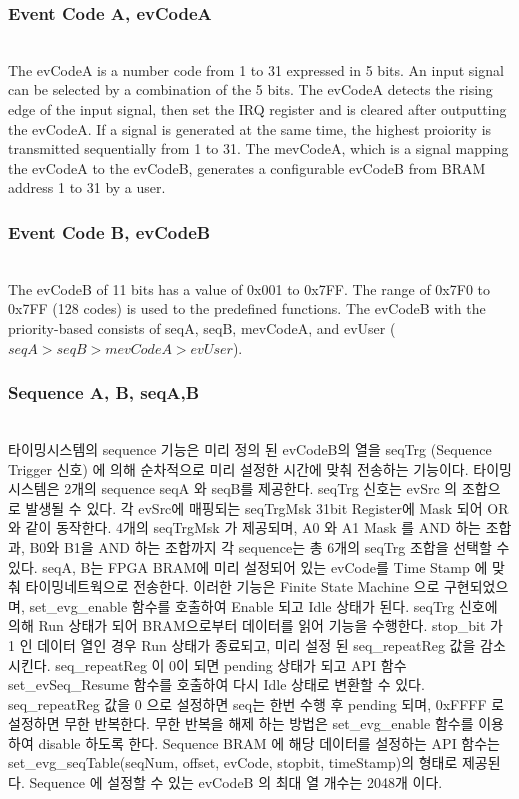 \documentclass[journal]{IEEEtran}
\begin{document}
\subsubsection{Event Code A, evCodeA}\hspace*{\fill} \\
The evCodeA is a number code from 1 to 31 expressed in 5 bits. An input signal can be selected by a combination of the 5 bits. The evCodeA detects the rising edge of the input signal, then set the IRQ register and is cleared after outputting the evCodeA. If a signal is generated at the same time, the highest proiority is transmitted sequentially from 1 to 31. The mevCodeA, which is a signal mapping the evCodeA to the evCodeB, generates a configurable evCodeB from BRAM address 1 to 31 by a user.\newline

\subsubsection{Event Code B, evCodeB}\hspace*{\fill} \\
The evCodeB of 11 bits has a value of 0x001 to 0x7FF. The range of 0x7F0 to 0x7FF (128 codes) is used to the predefined functions. The evCodeB with the priority-based consists of seqA, seqB, mevCodeA, and evUser ($seqA > seqB > mevCodeA > evUser$). \newline

\subsubsection{Sequence A, B, seqA,B}\hspace*{\fill} \\
타이밍시스템의 sequence 기능은 미리 정의 된 evCodeB의 열을 seqTrg (Sequence Trigger 신호) 에 의해 순차적으로 미리 설정한 시간에 맞춰 전송하는 기능이다. 타이밍시스템은 2개의 sequence seqA 와 seqB를 제공한다. seqTrg 신호는 evSrc 의 조합으로 발생될 수 있다. 각 evSrc에 매핑되는 seqTrgMsk 31bit Register에 Mask 되어 OR와 같이 동작한다. 4개의 seqTrgMsk 가 제공되며, A0 와 A1 Mask 를 AND 하는 조합과, B0와 B1을 AND 하는 조합까지 각 sequence는 총 6개의 seqTrg 조합을 선택할 수 있다. seqA, B는 FPGA BRAM에 미리 설정되어 
있는 evCode를 Time Stamp 에 맞춰 타이밍네트웍으로 전송한다. 이러한 기능은 Finite State Machine 으로 구현되었으며, set\_evg\_enable 함수를 호출하여 Enable 되고 Idle 상태가 된다. seqTrg 신호에 의해 Run 상태가 되어 BRAM으로부터 데이터를 읽어 기능을 수행한다. stop\_bit 가 1 인 데이터 열인 경우 Run 상태가 종료되고, 미리 설정 된 seq\_repeatReg 값을
감소시킨다. seq\_repeatReg 이 0이 되면 pending 상태가 되고 API 함수 set\_evSeq\_Resume 함수를 호출하여 다시 Idle 상태로 변환할 수 있다. seq\_repeatReg 값을 0 으로 설정하면 seq는 한번 수행 후 pending 되며, 0xFFFF 로 설정하면 무한 반복한다. 무한 반복을 해제 하는 방법은 set\_evg\_enable 함수를 이용하여 disable 하도록 한다.
Sequence BRAM 에 해당 데이터를 설정하는 API 함수는 set\_evg\_seqTable(seqNum,  offset, evCode, stopbit, timeStamp)의 형태로 제공된다. Sequence 에 설정할 수 있는 evCodeB 의 최대 열 개수는 2048개 이다.
\end{document}
